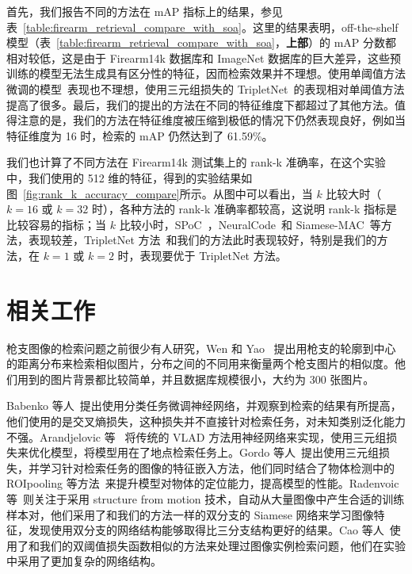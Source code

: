 首先，我们报告不同的方法在 mAP 指标上的结果，参见表~\ref{table:firearm_retrieval_compare_with_soa}。这里的结果表明，off-the-shelf 模型（表~\ref{table:firearm_retrieval_compare_with_soa}，\textbf{上部}）的 mAP 分数都相对较低，这是由于 Firearm14k 数据库和 ImageNet 数据库的巨大差异，这些预训练的模型无法生成具有区分性的特征，因而检索效果并不理想。使用单阈值方法微调的模型~\cite{Radenovic2016CNNIR}表现也不理想，使用三元组损失的 TripletNet~\cite{Gordo2016DeepIR}的表现相对单阈值方法提高了很多。最后，我们的提出的方法在不同的特征维度下都超过了其他方法。值得注意的是，我们的方法在特征维度被压缩到极低的情况下仍然表现良好，例如当特征维度为 16 时，检索的 mAP 仍然达到了 61.59\%。

我们也计算了不同方法在 Firearm14k 测试集上的 rank-k 准确率，在这个实验中，我们使用的 512 维的特征，得到的实验结果如图~\ref{fig:rank_k_accuracy_compare}所示。从图中可以看出，当 $k$ 比较大时（$k=16$ 或 $k=32$ 时），各种方法的 rank-k 准确率都较高，这说明 rank-k 指标是比较容易的指标；当 $k$ 比较小时，SPoC~\cite{Babenko2015AggregatingLD}，NeuralCode~\cite{Babenko2014NeuralCF}和 Siamese-MAC~\cite{Radenovic2016CNNIR}等方法，表现较差，TripletNet 方法~\cite{Gordo2016DeepIR}和我们的方法此时表现较好，特别是我们的方法，在 $k=1$ 或 $k=2$ 时，表现要优于 TripletNet 方法。

\section{相关工作}\label{sec:double_margin_related_work}
枪支图像的检索问题之前很少有人研究，Wen 和 Yao ~\cite{Wen2005PistolIR}提出用枪支的轮廓到中心的距离分布来检索相似图片，分布之间的不同用来衡量两个枪支图片的相似度。他们用到的图片背景都比较简单，并且数据库规模很小，大约为 300 张图片。

Babenko 等人~\cite{Babenko2014NeuralCF}提出使用分类任务微调神经网络，并观察到检索的结果有所提高，他们使用的是交叉熵损失，这种损失并不直接针对检索任务，对未知类别泛化能力不强。Arandjelovic 等~\cite{Arandjelovic2016NetVLADCA} 将传统的 VLAD 方法用神经网络来实现，使用三元组损失来优化模型，将模型用在了地点检索任务上。Gordo 等人~\cite{Gordo2016DeepIR}提出使用三元组损失，并学习针对检索任务的图像的特征嵌入方法，他们同时结合了物体检测中的 ROIpooling 等方法~\cite{Ren2017FasterRT}来提升模型对物体的定位能力，提高模型的性能。Radenvoic 等~\cite{Radenovic2016CNNIR}则关注于采用 structure from motion 技术，自动从大量图像中产生合适的训练样本对，他们采用了和我们的方法一样的双分支的 Siamese 网络来学习图像特征，发现使用双分支的网络结构能够取得比三分支结构更好的结果。Cao 等人~\cite{Cao2016QuartetnetLF}使用了和我们的双阈值损失函数相似的方法来处理过图像实例检索问题，他们在实验中采用了更加复杂的网络结构。

